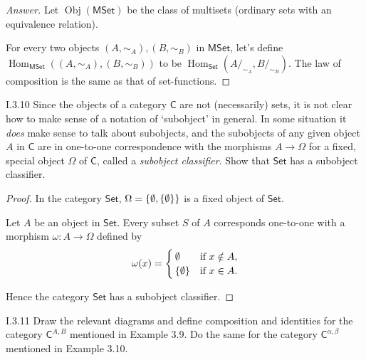 \begin{proof}[Answer]
	Let $\operatorname{Obj}(\mathsf{MSet})$ be the class of multisets (ordinary sets with an equivalence relation).

	For every two objects $(A, \sim_{A}), (B, \sim_{B})$ in $\mathsf{MSet}$, let's define $\operatorname{Hom}_{\mathsf{MSet}}((A, \sim_{A}), (B, \sim_{B}))$ to be $\operatorname{Hom}_{\mathsf{Set}}(A/_{\sim_{A}}, B/_{\sim_{B}})$. The law of composition is the same as that of set-functions.
\end{proof}

\begin{exercise}{I.3.10}
	Since the objects of a category $\mathsf{C}$ are not (necessarily) sets, it is not clear how to make sense of a notation of `subobject' in general. In some situation it \textit{does} make sense to talk about subobjects, and the subobjects of any given object $A$ in $\mathsf{C}$ are in one-to-one correspondence with the morphisms $A\to \Omega$ for a fixed, special object $\Omega$ of $\mathsf{C}$, called a \textit{subobject classifier}. Show that $\mathsf{Set}$ has a subobject classifier.
\end{exercise}

\begin{proof}
	In the category $\mathsf{Set}$, $\Omega = \left\{{\emptyset, \left\{{\emptyset}\right\}}\right\}$ is a fixed object of $\mathsf{Set}$.

	Let $A$ be an object in $\mathsf{Set}$. Every subset $S$ of $A$ corresponds one-to-one with a morphism $\omega: A\to \Omega$ defined by
	\begin{align*}
		\omega(x) = \begin{cases}
			            \emptyset       & \text{if $x\notin A$}, \\
			            \left\{{\emptyset}\right\} & \text{if $x\in A$}.
		            \end{cases}
	\end{align*}

	Hence the category $\mathsf{Set}$ has a subobject classifier.
\end{proof}

\begin{exercise}{I.3.11}
	Draw the relevant diagrams and define composition and identities for the category ${\mathsf{C}}^{A, B}$ mentioned in Example 3.9. Do the same for the category ${\mathsf{C}}^{\alpha,\beta}$ mentioned in Example 3.10.
\end{exercise}

